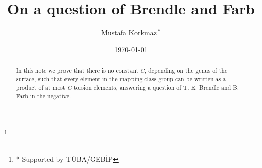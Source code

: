\documentclass[11pt]{amsart}
\theoremstyle{definition}
\theoremstyle{remark}
\begin{document}
\newenvironment{prooff}{\medskip \par \noindent {\it Proof}\ }{\hfill
$\square$ \medskip \par}
    \def\sqr#1#2{{\vcenter{\hrule height.#2pt
        \hbox{\vrule width.#2pt height#1pt \kern#1pt
            \vrule width.#2pt}\hrule height.#2pt}}}
    \def\square{\mathchoice\sqr67\sqr67\sqr{2.1}6\sqr{1.5}6}
\def\pf#1{\medskip \par \noindent {\it #1.}\ }
\def\endpf{\hfill $\square$ \medskip \par}
\def\demo#1{\medskip \par \noindent {\it #1.}\ }
\def\enddemo{\medskip \par}
\def\qed{~\hfill$\square$}

 \title[On a question of Brendle and Farb]
{On a question of Brendle and Farb }

\author[Mustafa Korkmaz]{Mustafa Korkmaz$\,^*$ }



 \address{Department of Mathematics, Middle East Technical University,
 06531 Ankara, Turkey} 

 \date{\today}
\thanks{* Supported by T\"UBA/GEB\.{I}P}
\begin{abstract}
In this note we prove that there is no constant $C$, depending on 
the genus of the surface, such that 
every element in the mapping class group can be written as a 
product of at most $C$ torsion elements, answering a question of 
T. E. Brendle and B. Farb in the negative.\\


\end{abstract}

 \maketitle
\end{document}
